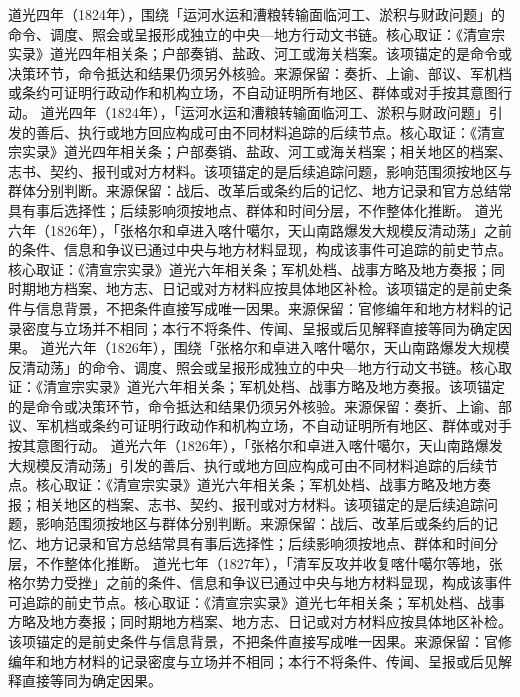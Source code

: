 道光四年（1824年），围绕「运河水运和漕粮转输面临河工、淤积与财政问题」的命令、调度、照会或呈报形成独立的中央—地方行动文书链。核心取证：《清宣宗实录》道光四年相关条；户部奏销、盐政、河工或海关档案。该项锚定的是命令或决策环节，命令抵达和结果仍须另外核验。来源保留：奏折、上谕、部议、军机档或条约可证明行政动作和机构立场，不自动证明所有地区、群体或对手按其意图行动。
道光四年（1824年），「运河水运和漕粮转输面临河工、淤积与财政问题」引发的善后、执行或地方回应构成可由不同材料追踪的后续节点。核心取证：《清宣宗实录》道光四年相关条；户部奏销、盐政、河工或海关档案；相关地区的档案、志书、契约、报刊或对方材料。该项锚定的是后续追踪问题，影响范围须按地区与群体分别判断。来源保留：战后、改革后或条约后的记忆、地方记录和官方总结常具有事后选择性；后续影响须按地点、群体和时间分层，不作整体化推断。
道光六年（1826年），「张格尔和卓进入喀什噶尔，天山南路爆发大规模反清动荡」之前的条件、信息和争议已通过中央与地方材料显现，构成该事件可追踪的前史节点。核心取证：《清宣宗实录》道光六年相关条；军机处档、战事方略及地方奏报；同时期地方档案、地方志、日记或对方材料应按具体地区补检。该项锚定的是前史条件与信息背景，不把条件直接写成唯一因果。来源保留：官修编年和地方材料的记录密度与立场并不相同；本行不将条件、传闻、呈报或后见解释直接等同为确定因果。
道光六年（1826年），围绕「张格尔和卓进入喀什噶尔，天山南路爆发大规模反清动荡」的命令、调度、照会或呈报形成独立的中央—地方行动文书链。核心取证：《清宣宗实录》道光六年相关条；军机处档、战事方略及地方奏报。该项锚定的是命令或决策环节，命令抵达和结果仍须另外核验。来源保留：奏折、上谕、部议、军机档或条约可证明行政动作和机构立场，不自动证明所有地区、群体或对手按其意图行动。
道光六年（1826年），「张格尔和卓进入喀什噶尔，天山南路爆发大规模反清动荡」引发的善后、执行或地方回应构成可由不同材料追踪的后续节点。核心取证：《清宣宗实录》道光六年相关条；军机处档、战事方略及地方奏报；相关地区的档案、志书、契约、报刊或对方材料。该项锚定的是后续追踪问题，影响范围须按地区与群体分别判断。来源保留：战后、改革后或条约后的记忆、地方记录和官方总结常具有事后选择性；后续影响须按地点、群体和时间分层，不作整体化推断。
道光七年（1827年），「清军反攻并收复喀什噶尔等地，张格尔势力受挫」之前的条件、信息和争议已通过中央与地方材料显现，构成该事件可追踪的前史节点。核心取证：《清宣宗实录》道光七年相关条；军机处档、战事方略及地方奏报；同时期地方档案、地方志、日记或对方材料应按具体地区补检。该项锚定的是前史条件与信息背景，不把条件直接写成唯一因果。来源保留：官修编年和地方材料的记录密度与立场并不相同；本行不将条件、传闻、呈报或后见解释直接等同为确定因果。
